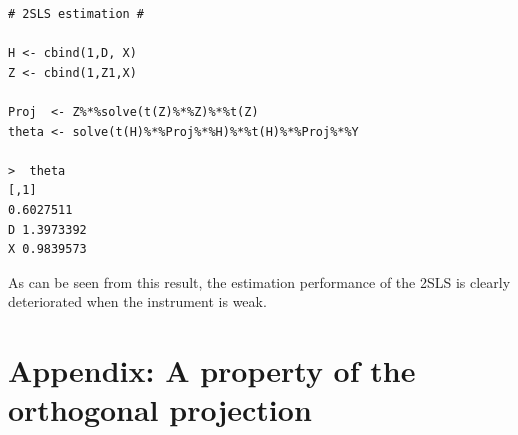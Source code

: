 \documentclass[10.5pt, A4paper, openany, uplatex]{book}
\numberwithin{equation}{section}
\begin{document}
\begin{lstlisting}[basicstyle=\ttfamily\footnotesize, frame=single]
# 2SLS estimation #

H <- cbind(1,D, X)
Z <- cbind(1,Z1,X)

Proj  <- Z%*%solve(t(Z)%*%Z)%*%t(Z)
theta <- solve(t(H)%*%Proj%*%H)%*%t(H)%*%Proj%*%Y

>  theta
[,1]
0.6027511
D 1.3973392
X 0.9839573
\end{lstlisting}
As can be seen from this result, the estimation performance of the 2SLS is clearly deteriorated when the instrument is weak.

\section*{Appendix: A property of the orthogonal projection}
	
\end{document}
